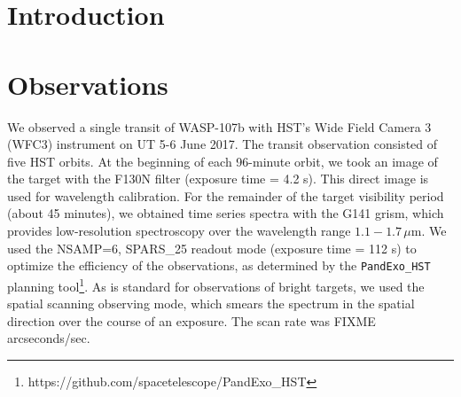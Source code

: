 \documentclass[twocolumn]{aastex61}
\begin{document}




\section{Introduction} \label{sec:intro}

\section{Observations}
We observed a single transit of WASP-107b with HST's Wide Field Camera 3 (WFC3) instrument on UT 5-6 June 2017.  The transit observation consisted of five HST orbits. At the beginning of each 96-minute orbit, we took an image of the target with the F130N filter (exposure time = 4.2 s). This direct image is used for wavelength calibration. For the remainder of the target visibility period (about 45 minutes), we obtained time series spectra with the G141 grism, which provides low-resolution spectroscopy over the wavelength range $1.1 - 1.7\,\mu$m.  We used the NSAMP=6, SPARS\_25 readout mode (exposure time = 112 s) to optimize the efficiency of the observations, as determined by the \texttt{PandExo\_HST} planning tool\footnote{https://github.com/spacetelescope/PandExo\_HST}.  As is standard for observations of bright targets, we used the spatial scanning observing mode, which smears the spectrum in the spatial direction over the course of an exposure. The scan rate was FIXME arcseconds/sec.
\end{document}
